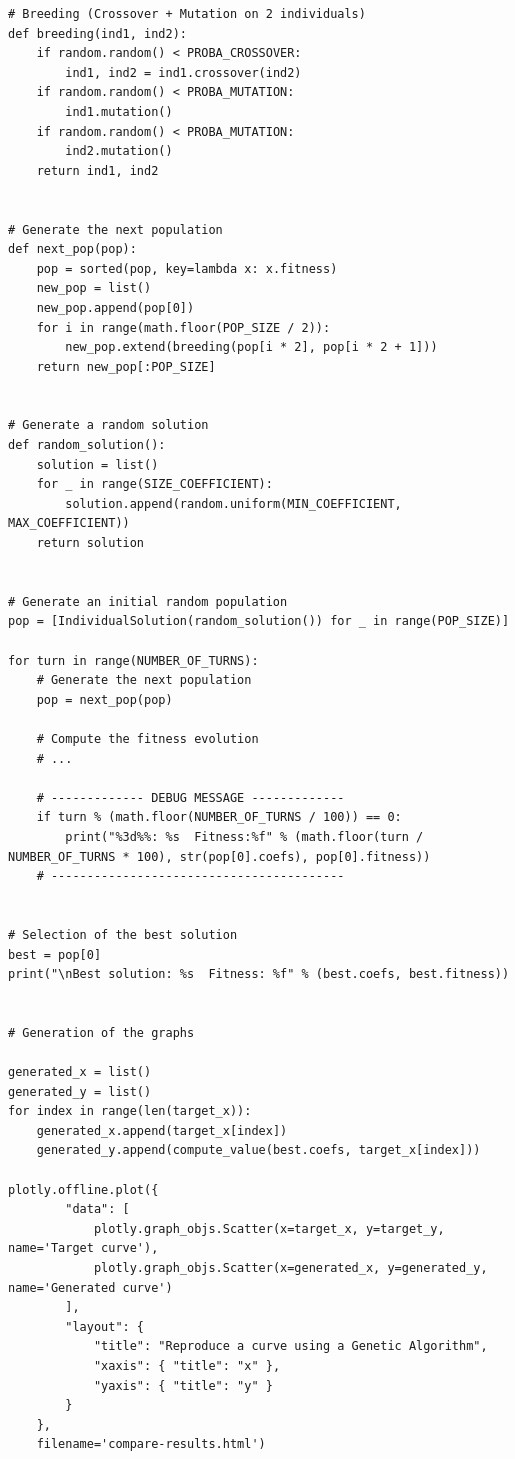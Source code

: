 \documentclass[12pt]{article}
\begin{document}
\begin{lstlisting}[frame=single,caption=Compute of the fitness value]
# Breeding (Crossover + Mutation on 2 individuals)
def breeding(ind1, ind2):
    if random.random() < PROBA_CROSSOVER:
        ind1, ind2 = ind1.crossover(ind2)
    if random.random() < PROBA_MUTATION:
        ind1.mutation()
    if random.random() < PROBA_MUTATION:
        ind2.mutation()
    return ind1, ind2


# Generate the next population
def next_pop(pop):
    pop = sorted(pop, key=lambda x: x.fitness)
    new_pop = list()
    new_pop.append(pop[0])
    for i in range(math.floor(POP_SIZE / 2)):
        new_pop.extend(breeding(pop[i * 2], pop[i * 2 + 1]))
    return new_pop[:POP_SIZE]


# Generate a random solution
def random_solution():
    solution = list()
    for _ in range(SIZE_COEFFICIENT):
        solution.append(random.uniform(MIN_COEFFICIENT, MAX_COEFFICIENT))
    return solution


# Generate an initial random population
pop = [IndividualSolution(random_solution()) for _ in range(POP_SIZE)]

for turn in range(NUMBER_OF_TURNS):
    # Generate the next population
    pop = next_pop(pop)

    # Compute the fitness evolution
    # ...

    # ------------- DEBUG MESSAGE -------------
    if turn % (math.floor(NUMBER_OF_TURNS / 100)) == 0:
        print("%3d%%: %s  Fitness:%f" % (math.floor(turn / NUMBER_OF_TURNS * 100), str(pop[0].coefs), pop[0].fitness))
    # -----------------------------------------


# Selection of the best solution
best = pop[0]
print("\nBest solution: %s  Fitness: %f" % (best.coefs, best.fitness))


# Generation of the graphs

generated_x = list()
generated_y = list()
for index in range(len(target_x)):
    generated_x.append(target_x[index])
    generated_y.append(compute_value(best.coefs, target_x[index]))

plotly.offline.plot({
        "data": [
            plotly.graph_objs.Scatter(x=target_x, y=target_y, name='Target curve'),
            plotly.graph_objs.Scatter(x=generated_x, y=generated_y, name='Generated curve')
        ],
        "layout": {
            "title": "Reproduce a curve using a Genetic Algorithm",
            "xaxis": { "title": "x" },
            "yaxis": { "title": "y" }
        }
    },
    filename='compare-results.html')
\end{lstlisting}
\end{document}
